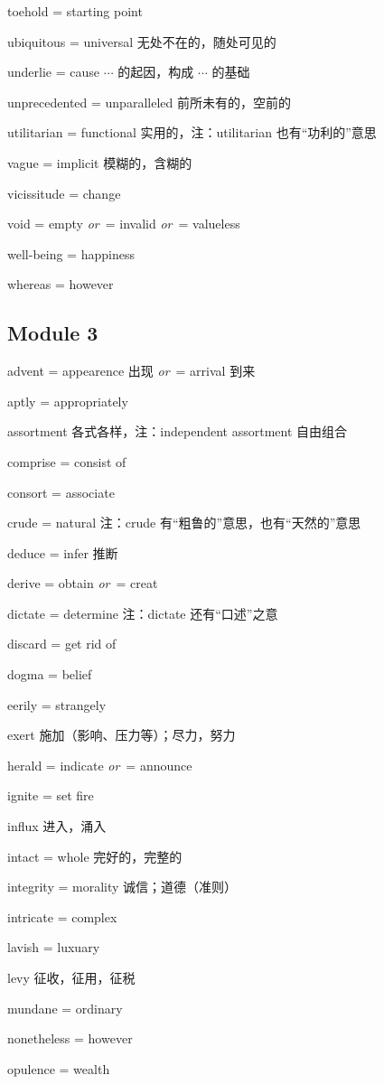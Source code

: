 \documentclass[UTF8, fontset = none, zihao = -4, linespread = 1.1]{ctexart}
\renewcommand{\o}{\textit{or}\ }
\begin{document}
\begin{multicols}{2}
toehold = starting point

ubiquitous = universal 无处不在的，随处可见的

underlie = cause $\cdots$ 的起因，构成 $\cdots$ 的基础

unprecedented = unparalleled 前所未有的，空前的

utilitarian = functional 实用的，注：utilitarian 也有“功利的”意思

vague = implicit 模糊的，含糊的

vicissitude = change

void = empty \o = invalid \o = valueless

well-being = happiness

whereas = however

\subsection*{Module 3}
advent = appearence 出现 \o = arrival 到来

aptly = appropriately

assortment 各式各样，注：independent assortment 自由组合

comprise = consist of

consort = associate 

crude = natural 注：crude 有“粗鲁的”意思，也有“天然的”意思

deduce = infer 推断

derive = obtain \o = creat

dictate = determine 注：dictate 还有“口述”之意

discard = get rid of

dogma = belief

eerily = strangely

exert 施加（影响、压力等）；尽力，努力

herald = indicate \o = announce

ignite = set fire 

influx 进入，涌入

intact = whole 完好的，完整的

integrity = morality 诚信；道德（准则）

intricate = complex

lavish = luxuary

levy 征收，征用，征税

mundane = ordinary

nonetheless = however

opulence = wealth


\end{multicols}
\end{document}
